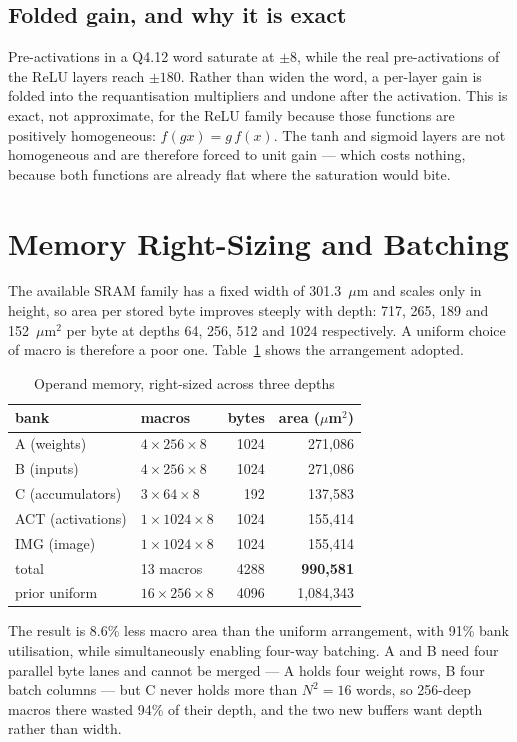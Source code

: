 \documentclass[conference,a4paper]{APSIPA2026}
\begin{document}
\subsection{Folded gain, and why it is exact}
Pre-activations in a Q4.12 word saturate at $\pm 8$, while the real pre-activations of the ReLU layers reach $\pm 180$. Rather than widen the word, a per-layer gain is folded into the requantisation multipliers and undone after the activation. This is exact, not approximate, for the ReLU family because those functions are positively homogeneous: $f(gx) = g\,f(x)$. The tanh and sigmoid layers are not homogeneous and are therefore forced to unit gain --- which costs nothing, because both functions are already flat where the saturation would bite.

\section{Memory Right-Sizing and Batching}\label{sec:mem}
The available SRAM family has a fixed width of 301.3~$\mu$m and scales only in height, so area per stored byte improves steeply with depth: 717, 265, 189 and 152~$\mu$m$^2$ per byte at depths 64, 256, 512 and 1024 respectively. A uniform choice of macro is therefore a poor one. Table~\ref{tab:mem} shows the arrangement adopted.

\begin{table}[t]
\centering
\caption{Operand memory, right-sized across three depths}
\label{tab:mem}
\begin{tabular}{llrr}
\toprule
bank & macros & bytes & area ($\mu$m$^2$) \\
\midrule
A (weights)      & $4\times256\times8$  & 1024 & 271{,}086 \\
B (inputs)       & $4\times256\times8$  & 1024 & 271{,}086 \\
C (accumulators) & $3\times64\times8$   & 192  & 137{,}583 \\
ACT (activations)& $1\times1024\times8$ & 1024 & 155{,}414 \\
IMG (image)      & $1\times1024\times8$ & 1024 & 155{,}414 \\
\midrule
total            & 13 macros            & 4288 & \textbf{990{,}581} \\
prior uniform    & $16\times256\times8$ & 4096 & 1{,}084{,}343 \\
\bottomrule
\end{tabular}
\end{table}

The result is 8.6\% less macro area than the uniform arrangement, with 91\% bank utilisation, while simultaneously enabling four-way batching. A and B need four parallel byte lanes and cannot be merged --- A holds four weight rows, B four batch columns --- but C never holds more than $N^2 = 16$ words, so 256-deep macros there wasted 94\% of their depth, and the two new buffers want depth rather than width.
\end{document}
